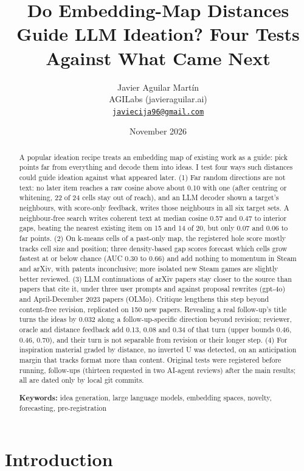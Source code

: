 \documentclass[
  10pt,
]{article}
\title{Do Embedding-Map Distances Guide
LLM Ideation? Four Tests Against What
Came Next}
\author{Javier Aguilar Martín\\
AGILabs (javieraguilar.ai)\\
\href{mailto:javiecija96@gmail.com}{\nolinkurl{javiecija96@gmail.com}}}
\date{November 2026}
\begin{document}
\maketitle
\begin{abstract}
A popular ideation recipe treats an
embedding map of existing work as a
guide: pick points far from everything
and decode them into ideas. I test four
ways such distances could guide ideation
against what appeared later. (1) Far
random directions are not text: no later
item reaches a raw cosine above about
0.10 with one (after centring or
whitening, 22 of 24 cells stay out of
reach), and an LLM decoder shown a
target's neighbours, with score-only
feedback, writes those neighbours in all
six target sets. A neighbour-free search
writes coherent text at median cosine
0.57 and 0.47 to interior gaps, beating
the nearest existing item on 15 and 14
of 20, but only 0.07 and 0.06 to far
points. (2) On k-means cells of a
past-only map, the registered hole score
mostly tracks cell size and position;
three density-based gap scores forecast
which cells grow fastest at or below
chance (AUC 0.30 to 0.66) and add
nothing to momentum in Steam and arXiv,
with patents inconclusive; more isolated
new Steam games are slightly better
reviewed. (3) LLM continuations of arXiv
papers stay closer to the source than
papers that cite it, under three user
prompts and against proposal rewrites
(gpt-4o) and April-December 2023 papers
(OLMo). Critique lengthens this step
beyond content-free revision, replicated
on 150 new papers. Revealing a real
follow-up's title turns the ideas by
0.032 along a follow-up-specific
direction beyond revision; reviewer,
oracle and distance feedback add 0.13,
0.08 and 0.34 of that turn (upper bounds
0.46, 0.46, 0.70), and their turn is not
separable from revision or their longer
step. (4) For inspiration material
graded by distance, no inverted U was
detected, on an anticipation margin that
tracks format more than content.
Original tests were registered before
running, follow-ups (thirteen requested
in two AI-agent reviews) after the main
results; all are dated only by local git
commits.

\textbf{Keywords:} idea generation,
large language models, embedding spaces,
novelty, forecasting, pre-registration
\end{abstract}

\section{Introduction}\label{sec:1}
\end{document}
